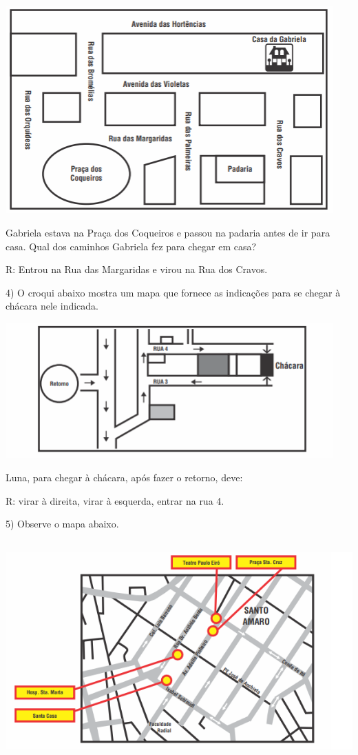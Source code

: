 \includegraphics[width=4.95347in,height=3.13958in]{./imgSAEB_6_MAT/media/image66.png}

Gabriela estava na Praça dos Coqueiros e passou na padaria antes de ir
para casa. Qual dos caminhos Gabriela fez para chegar em casa?

R: Entrou na Rua das Margaridas e virou na Rua dos Cravos.

4) O croqui abaixo mostra um mapa que fornece as indicações para se
chegar à chácara nele indicada.

\includegraphics[width=4.95347in,height=2.04653in]{./imgSAEB_6_MAT/media/image67.png}

Luna, para chegar à chácara, após fazer o retorno, deve:

R: virar à direita, virar à esquerda, entrar na rua 4.

5) Observe o mapa abaixo.

\includegraphics[width=5.90625in,height=3.34375in]{./imgSAEB_6_MAT/media/image68.png}

